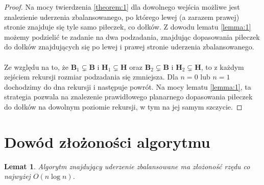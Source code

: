 \documentclass[10pt,a4paper]{article}
\newtheorem{lemma}{Lemat}
\begin{document}
	\begin{proof}
		Na mocy twierdzenia \ref{theorem:1} dla dowolnego wejścia możliwe jest znalezienie uderzenia zbalansowanego, po którego lewej (a zarazem prawej) stronie znajduje się tyle samo piłeczek, co dołków. Z dowodu lematu \ref{lemma:1} możemy podzielić te zadanie na dwa podzadania, znajdując dopasowania piłeczek do dołków znajdujących się po lewej i prawej stronie uderzenia zbalansowanego. \\~\\
		Ze względu na to, że $\mathbf{B}_{1} \subsetneq \mathbf{B}$ i $\mathbf{H}_{1} \subsetneq \mathbf{H}$ oraz $\mathbf{B}_{2} \subsetneq \mathbf{B}$ i $\mathbf{H}_{2} \subsetneq \mathbf{H}$, to z każdym zejściem rekursji rozmiar podzadania się zmniejsza. Dla $n = 0$ lub $n = 1$ dochodzimy do dna rekursji i następuje powrót. Na mocy lematu \ref{lemma:1}, ta strategia pozwala na znalezenie prawidłowego planarnego dopasowania piłeczek do dołków na dowolnym poziomie rekursji, w tym na jej samym szczycie.
	\end{proof}
	
	\vspace{2em}
	
	\section{Dowód złożoności algorytmu}
	
	\begin{lemma} \label{lemma:2}
		Algorytm znajdujący uderzenie zbalansowane ma złożoność rzędu co najwyżej $O(n \log n)$.
	\end{lemma}
	
\end{document}
